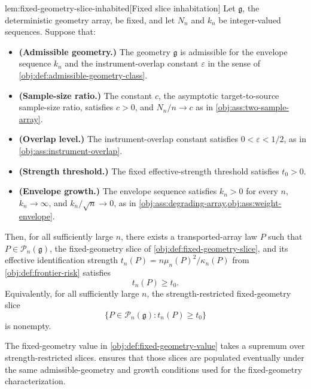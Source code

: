 \begin{lemmav}{lem:fixed-geometry-slice-inhabited}[Fixed slice inhabitation]
Let \(\mathfrak g\), the deterministic geometry array, be fixed, and let \(N_n\) and \(k_n\) be integer-valued sequences. Suppose that:
\begin{itemize}
\item \textbf{(Admissible geometry.)} The geometry \(\mathfrak g\) is admissible for the envelope sequence \(k_n\) and the instrument-overlap constant \(\varepsilon\) in the sense of \cref{obj:def:admissible-geometry-class}.
\item \textbf{(Sample-size ratio.)} The constant \(c\), the asymptotic target-to-source sample-size ratio, satisfies \(c>0\), and \(N_n/n\to c\) as in \cref{obj:ass:two-sample-array}.
\item \textbf{(Overlap level.)} The instrument-overlap constant satisfies \(0<\varepsilon<1/2\), as in \cref{obj:ass:instrument-overlap}.
\item \textbf{(Strength threshold.)} The fixed effective-strength threshold satisfies \(t_0>0\).
\item \textbf{(Envelope growth.)} The envelope sequence satisfies \(k_n>0\) for every \(n\), \(k_n\to\infty\), and \(k_n/\sqrt n\to0\), as in \cref{obj:ass:degrading-array,obj:ass:weight-envelope}.
\end{itemize}
Then, for all sufficiently large \(n\), there exists a transported-array law \(P\) such that \(P\in\mathcal P_n(\mathfrak g)\), the fixed-geometry slice of \cref{obj:def:fixed-geometry-slice}, and its effective identification strength \(t_n(P)=n\mu_n(P)^2/\kappa_n(P)\) from \cref{obj:def:frontier-risk} satisfies
\[
t_n(P)\ge t_0 .
\]
Equivalently, for all sufficiently large \(n\), the strength-restricted fixed-geometry slice
\[
\{P\in\mathcal P_n(\mathfrak g): t_n(P)\ge t_0\}
\]
is nonempty.
\end{lemmav}

The fixed-geometry value in \cref{obj:def:fixed-geometry-value} takes a supremum over strength-restricted slices.  ensures that those slices are populated eventually under the same admissible-geometry and growth conditions used for the fixed-geometry characterization.

